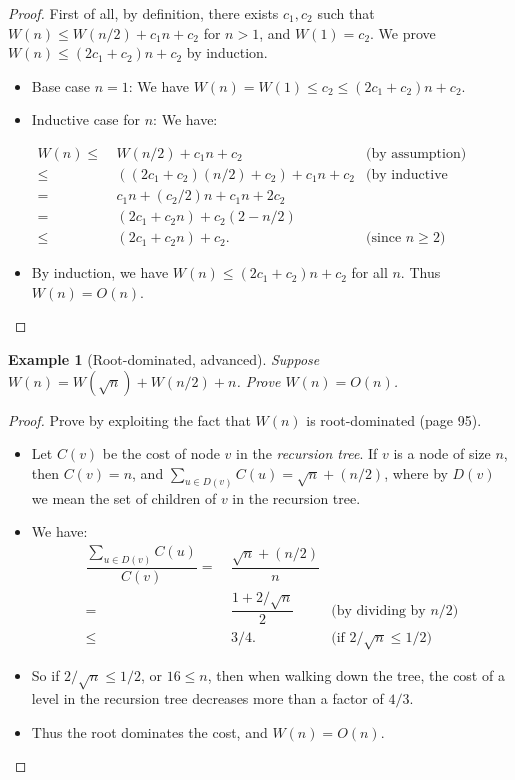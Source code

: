 \documentclass[11pt,a4paper,oneside,microtype,nokorean]{oblivoir}
\newtheorem{example}{Example}
\begin{document}
\begin{proof}
  First of all, by definition, there exists $c_1,c_2$ such that $W(n) \le W(n/2) + c_1 n + c_2$ for
  $n > 1$, and $W(1) = c_2$.  We prove $W(n) \le (2 c_1 + c_2) n + c_2$ by induction.

  \begin{itemize}
  \item Base case $n=1$: We have $W(n) = W(1) \le c_2 \le (2 c_1 + c_2) n + c_2$.

  \item Inductive case for $n$: We have:

    \begin{align*}
      W(n)
      \le &~ W(n/2) + c_1 n + c_2 & \mbox{(by assumption)} \\
      \le &~ ((2 c_1 + c_2) (n/2) + c_2) + c_1 n + c_2 & \mbox{(by inductive hypothesis)} \\
      = &~ c_1 n + (c_2 / 2) n + c_1 n + 2 c_2 \\
      = &~ (2 c_1 + c_2 n) + c_2 (2 - n/2) \\
      \le &~ (2 c_1 + c_2 n) + c_2. & \mbox{(since $n \ge 2$)}
    \end{align*}

  \item By induction, we have $W(n) \le (2 c_1 + c_2) n + c_2$ for all $n$.  Thus $W(n) = O(n)$.
  \end{itemize}
\end{proof}

\begin{example}[Root-dominated, advanced] Suppose $W(n) = W(\sqrt{n}) + W(n/2) + n$.  Prove
  $W(n) = O(n)$.
\end{example}


\begin{proof}
  Prove by exploiting the fact that $W(n)$ is root-dominated (page 95).

  \begin{itemize}
  \item Let $C(v)$ be the cost of node $v$ in the \emph{recursion tree}.  If $v$ is a node of size
    $n$, then $C(v) = n$, and $\sum_{u \in D(v)} C(u) = \sqrt{n} + (n/2)$, where by $D(v)$ we mean
    the set of children of $v$ in the recursion tree.
  \item We have:
    \begin{align*}
      \dfrac{\sum_{u \in D(v)} C(u)}{C(v)}
      = &~ \dfrac{\sqrt{n} + (n/2)}{n} \\
      = &~ \dfrac{1 + 2/\sqrt{n}}{2} & \mbox{(by dividing by $n/2$)} \\
      \le &~ 3/4. & \mbox{(if $2/\sqrt{n} \le 1/2$)}
    \end{align*}
  \item So if $2/\sqrt{n} \le 1/2$, or $16 \le n$, then when walking down the tree, the cost of a
    level in the recursion tree decreases more than a factor of $4/3$.
  \item Thus the root dominates the cost, and $W(n) = O(n)$.
  \end{itemize}
\end{proof}
\end{document}
